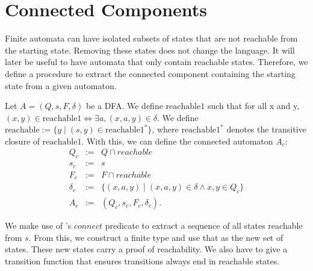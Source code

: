 \section{Connected Components}
 
Finite automata can have isolated subsets of states that are not reachable from the starting state. 
Removing these states does not change the language.
It will later be useful to have automata that only contain reachable states. 
Therefore, we define a procedure to extract the connected component containing the starting state from a given automaton.

\begin{definition}
    \label{A_c}
    Let $A = (Q, s, F, \delta)$ be a DFA.
    We define $\mathrm{reachable1}$ such that for all x and y, 
    $(x,y) \in \mathrm{reachable1} \iff \exists a, (x,a,y) \in \delta$.
    We define $\mathrm{reachable} := \{y \; | \; (s,y) \in \mathrm{reachable1}^*\}$, 
    where $\mathrm{reachable1}^*$ denotes the transitive closure of $\mathrm{reachable1}$.
    With this, we can define the connected automaton $A_c$:
    \begin{eqnarray*}
        Q_c & := & Q \cap reachable \\
        s_c & := & s \\
        F_c & := & F \cap reachable \\
        \delta_c & := & \{(x, a, y) \; | \; (x, a, y) \in \delta \wedge x,y \in Q_c \} \\
        A_c &:=& (Q_c, s_c, F_c, \delta_c).
    \end{eqnarray*}
\end{definition}


We make use of \ssreflect's $connect$ predicate to extract a sequence of all states reachable from $s$. 
From this, we construct a finite type and use that as the new set of states. 
These new states carry a proof of reachability. %
We also have to give a transition function that ensures transitions always end in reachable states.


